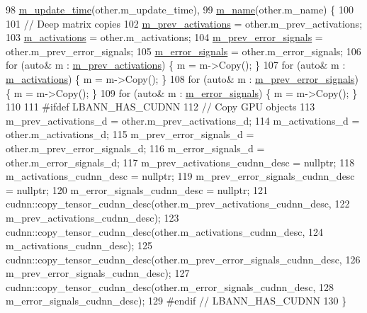 \begin{DoxyCode}
98   \hyperlink{classlbann_1_1Layer_ab7d84533662b02d01ba6685ad6f20935}{m\_update\_time}(other.m\_update\_time),
99   \hyperlink{classlbann_1_1Layer_aa47109ad09b399142fa92f9d3702189f}{m\_name}(other.m\_name) \{
100 
101   \textcolor{comment}{// Deep matrix copies}
102   \hyperlink{classlbann_1_1Layer_a52314601c3458268f56e017dc2ade357}{m\_prev\_activations}   = other.m\_prev\_activations;
103   \hyperlink{classlbann_1_1Layer_a7caf08e938141d1584e6939cefa4baed}{m\_activations}        = other.m\_activations;
104   \hyperlink{classlbann_1_1Layer_a6fdcbf884150d0b20cffe678fefd7caa}{m\_prev\_error\_signals} = other.m\_prev\_error\_signals;
105   \hyperlink{classlbann_1_1Layer_a452e22ac81c1a799f0614b3e942ea726}{m\_error\_signals}      = other.m\_error\_signals;
106   \textcolor{keywordflow}{for} (\textcolor{keyword}{auto}& m : \hyperlink{classlbann_1_1Layer_a52314601c3458268f56e017dc2ade357}{m\_prev\_activations})   \{ m = m->Copy(); \}
107   \textcolor{keywordflow}{for} (\textcolor{keyword}{auto}& m : \hyperlink{classlbann_1_1Layer_a7caf08e938141d1584e6939cefa4baed}{m\_activations})        \{ m = m->Copy(); \}
108   \textcolor{keywordflow}{for} (\textcolor{keyword}{auto}& m : \hyperlink{classlbann_1_1Layer_a6fdcbf884150d0b20cffe678fefd7caa}{m\_prev\_error\_signals}) \{ m = m->Copy(); \}
109   \textcolor{keywordflow}{for} (\textcolor{keyword}{auto}& m : \hyperlink{classlbann_1_1Layer_a452e22ac81c1a799f0614b3e942ea726}{m\_error\_signals})      \{ m = m->Copy(); \}
110 
111 \textcolor{preprocessor}{#ifdef LBANN\_HAS\_CUDNN}
112   \textcolor{comment}{// Copy GPU objects}
113   m\_prev\_activations\_d = other.m\_prev\_activations\_d;
114   m\_activations\_d = other.m\_activations\_d;
115   m\_prev\_error\_signals\_d = other.m\_prev\_error\_signals\_d;
116   m\_error\_signals\_d = other.m\_error\_signals\_d;
117   m\_prev\_activations\_cudnn\_desc = \textcolor{keyword}{nullptr};
118   m\_activations\_cudnn\_desc = \textcolor{keyword}{nullptr};
119   m\_prev\_error\_signals\_cudnn\_desc = \textcolor{keyword}{nullptr};
120   m\_error\_signals\_cudnn\_desc = \textcolor{keyword}{nullptr};
121   cudnn::copy\_tensor\_cudnn\_desc(other.m\_prev\_activations\_cudnn\_desc,
122                                 m\_prev\_activations\_cudnn\_desc);
123   cudnn::copy\_tensor\_cudnn\_desc(other.m\_activations\_cudnn\_desc,
124                                 m\_activations\_cudnn\_desc);
125   cudnn::copy\_tensor\_cudnn\_desc(other.m\_prev\_error\_signals\_cudnn\_desc,
126                                 m\_prev\_error\_signals\_cudnn\_desc);
127   cudnn::copy\_tensor\_cudnn\_desc(other.m\_error\_signals\_cudnn\_desc,
128                                 m\_error\_signals\_cudnn\_desc);
129 \textcolor{preprocessor}{#endif // LBANN\_HAS\_CUDNN}
130 \}
\end{DoxyCode}
\mbox{\label{classlbann_1_1Layer_a68c3f57587956da938406812f13ecb78}} 
